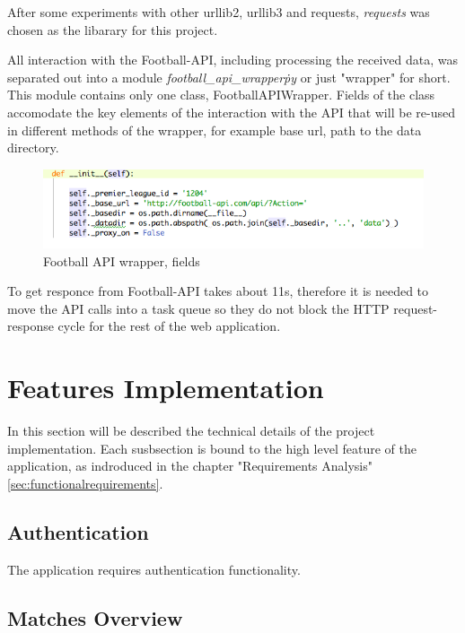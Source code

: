 After some experiments with other urllib2, urllib3 and requests, \emph{requests} was chosen as the libarary for this project.\par
		
All interaction with the Football-API, including processing the received data, was separated out into a module \emph{football\_api\_wrapper\.py} or just "wrapper" for short. This module contains only one class, FootballAPIWrapper. Fields of the class accomodate the key elements of the interaction with the API that will be re-used in different methods of the wrapper, for example base url, path to the data directory. \par
	
\begin{figure}[H]
\begin{center}
\includegraphics[width=.60\linewidth,natwidth=610,natheight=642]{impl/images/footballApiWrapperFields}
\caption{Football API wrapper, fields} \label{fig:using:footballapiwrapperfields}
\end{center}
\end{figure}
	
	To get responce from Football-API takes about 11s, therefore it is needed to move the API calls into a task queue so they do not block the HTTP request-response cycle for the rest of the web application.

\section{Features Implementation}

In this section will be described the technical details of the project implementation. Each susbsection is bound to the high level feature of the application, as indroduced in the chapter "Requirements Analysis" \ref{sec:functionalrequirements}.

\subsection{Authentication}

The application requires authentication functionality. 

\subsection{Matches Overview}
